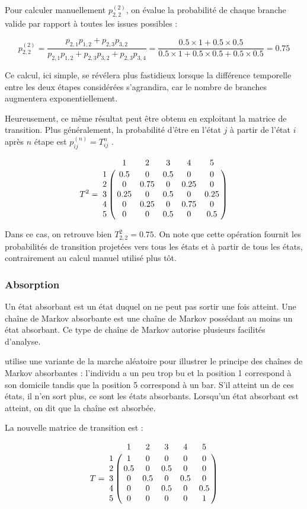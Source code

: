 \documentclass[12pt]{article}
\begin{document}
Pour calculer manuellement $p^{(2)}_{2,2}$, on évalue la probabilité
de chaque branche valide par rapport à toutes les issues possibles :

$$
p^{(2)}_{2,2}
= \frac{p_{2,1} p_{1,2} + p_{2,3} p_{3,2}}{p_{2,1} p_{1,2} + p_{2,3} p_{3,2} + p_{2,3} p_{3,4}}
= \frac{0.5 \times 1 + 0.5 \times 0.5}{0.5 \times 1 + 0.5 \times 0.5 + 0.5 \times 0.5}
= 0.75
$$
\vspace{0.5cm}

Ce calcul, ici simple, se révélera plus fastidieux lorsque la
différence temporelle entre les deux étapes considérées s'agrandira,
car le nombre de branches augmentera exponentiellement.

Heureusement, ce même résultat peut être obtenu en exploitant la
matrice de transition. Plus généralement, la probabilité d'être en
l'état $j$ à partir de l'état $i$ après $n$ étape est $p^{(n)}_{ij} =
T^n_{ij}$ \cite{snell}.

$$
T^2 = \bordermatrix{
    & 1 & 2 & 3 & 4 & 5 \cr
  1 & 0.5 & 0 & 0.5 & 0 & 0 \cr
  2 & 0 & 0.75 & 0 & 0.25 & 0 \cr
  3 & 0.25 & 0 & 0.5 & 0 & 0.25 \cr
  4 & 0 & 0.25 & 0 & 0.75 & 0 \cr
  5 & 0 & 0 & 0.5 & 0 & 0.5 \cr
}
$$
\vspace{0.5cm}

Dans ce cas, on retrouve bien $T^2_{2,2} = 0.75$. On note que cette
opération fournit les probabilités de transition projetées vers tous
les états et à partir de tous les états, contrairement au calcul
manuel utilisé plus tôt.

\subsubsection{Absorption}

Un état absorbant est un état duquel on ne peut pas sortir une fois
atteint. Une chaîne de Markov absorbante est une chaîne de Markov
possédant au moins un état absorbant. Ce type de chaîne de Markov
autorise plusieurs facilités d'analyse.

\cite{snell} utilise une variante de la marche aléatoire pour
illustrer le principe des chaînes de Markov absorbantes : l'individu a
un peu trop bu et la position 1 correspond à son domicile tandis que
la position 5 correspond à un bar. S'il atteint un de ces états, il
n'en sort plus, ce sont les états absorbants. Lorsqu'un état absorbant
est atteint, on dit que la chaîne est absorbée.

La nouvelle matrice de transition est :

$$
T = \bordermatrix{
    & 1 & 2 & 3 & 4 & 5 \cr
  1 & 1 & 0 & 0 & 0 & 0 \cr
  2 & 0.5 & 0 & 0.5 & 0 & 0 \cr
  3 & 0 & 0.5 & 0 & 0.5 & 0 \cr
  4 & 0 & 0 & 0.5 & 0 & 0.5 \cr
  5 & 0 & 0 & 0 & 0 & 1 \cr
}
$$
\vspace{0.5cm}
\end{document}
